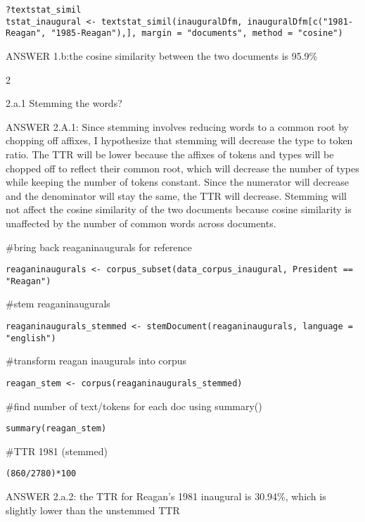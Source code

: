 \documentclass[
]{article}
\begin{document}
\begin{verbatim}
?textstat_simil
tstat_inaugural <- textstat_simil(inauguralDfm, inauguralDfm[c("1981-Reagan", "1985-Reagan"),], margin = "documents", method = "cosine")
\end{verbatim}

ANSWER 1.b:the cosine similarity between the two documents is 95.9\%

2

2.a.1 Stemming the words?

ANSWER 2.A.1: Since stemming involves reducing words to a common root by
chopping off affixes, I hypothesize that stemming will decrease the type
to token ratio. The TTR will be lower because the affixes of tokens and
types will be chopped off to reflect their common root, which will
decrease the number of types while keeping the number of tokens
constant. Since the numerator will decrease and the denominator will
stay the same, the TTR will decrease. Stemming will not affect the
cosine similarity of the two documents because cosine similarity is
unaffected by the number of common words across documents.

\#bring back reaganinaugurals for reference

\begin{verbatim}
reaganinaugurals <- corpus_subset(data_corpus_inaugural, President == "Reagan")
\end{verbatim}

\#stem reaganinaugurals

\begin{verbatim}
reaganinaugurals_stemmed <- stemDocument(reaganinaugurals, language = "english")
\end{verbatim}

\#transform reagan inaugurals into corpus

\begin{verbatim}
reagan_stem <- corpus(reaganinaugurals_stemmed)
\end{verbatim}

\#find number of text/tokens for each doc using summary()

\begin{verbatim}
summary(reagan_stem)
\end{verbatim}

\#TTR 1981 (stemmed)

\begin{verbatim}
(860/2780)*100
\end{verbatim}

ANSWER 2.a.2: the TTR for Reagan's 1981 inaugural is 30.94\%, which is
slightly lower than the unstemmed TTR
\end{document}
